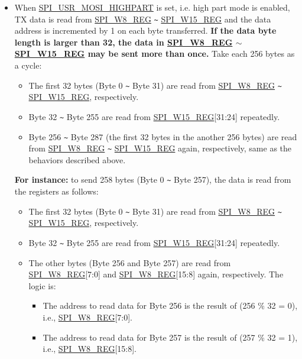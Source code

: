 \documentclass[main\_\_EN.tex]{subfiles}
\begin{document}
\begin{itemize}
\begin{itemize}
        \item When \hyperref[fielddesc:SPIUSRMOSIHIGHPART]{SPI\_USR\_MOSI\_HIGHPART} is set, i.e. high part mode is enabled, TX data is read from \hyperref[regdesc:SPIW8REG]{SPI\_W8\_REG} \verb+~+ \hyperref[regdesc:SPIW15REG]{SPI\_W15\_REG} and the data address is incremented by 1 on each byte transferred. \textbf{If the data byte length is larger than 32, the data in \hyperref[regdesc:SPIW8REG]{SPI\_W8\_REG} $\sim$ \hyperref[regdesc:SPIW15REG]{SPI\_W15\_REG} may be sent more than once.} Take each 256 bytes as a cycle:
        \begin{itemize}
            \item The first 32 bytes (Byte 0 \verb+~+ Byte 31) are read from \hyperref[regdesc:SPIW8REG]{SPI\_W8\_REG} \verb+~+ \hyperref[regdesc:SPIW15REG]{SPI\_W15\_REG}, respectively.
            \item Byte 32 \verb+~+ Byte 255 are read from \hyperref[regdesc:SPIW15REG]{SPI\_W15\_REG}[31:24] repeatedly.
            \item Byte 256 \verb+~+ Byte 287 (the first 32 bytes in the another 256 bytes) are read from \hyperref[regdesc:SPIW8REG]{SPI\_W8\_REG} \verb+~+ \hyperref[regdesc:SPIW15REG]{SPI\_W15\_REG} again, respectively, same as the behaviors described above.
        \end{itemize}
        \textbf{For instance:} to send 258 bytes (Byte 0 \verb+~+ Byte 257), the data is read from the registers as follows:
        \begin{itemize}
            \item The first 32 bytes (Byte 0 \verb+~+ Byte 31) are read from \hyperref[regdesc:SPIW8REG]{SPI\_W8\_REG} \verb+~+ \hyperref[regdesc:SPIW15REG]{SPI\_W15\_REG}, respectively.
            \item Byte 32 \verb+~+ Byte 255 are read from \hyperref[regdesc:SPIW15REG]{SPI\_W15\_REG}[31:24] repeatedly.
            \item The other bytes (Byte 256 and Byte 257) are read from \hyperref[regdesc:SPIW8REG]{SPI\_W8\_REG}[7:0] and \hyperref[regdesc:SPIW8REG]{SPI\_W8\_REG}[15:8] again, respectively. The logic is:
            \begin{itemize}
                \item The address to read data for Byte 256 is the result of (256 \% 32 = 0), i.e., \hyperref[regdesc:SPIW8REG]{SPI\_W8\_REG}[7:0].
                \item The address to read data for Byte 257 is the result of (257 \% 32 = 1), i.e., \hyperref[regdesc:SPIW8REG]{SPI\_W8\_REG}[15:8].
            \end{itemize}
        \end{itemize}
    \end{itemize}



\end{itemize}
\end{document}
